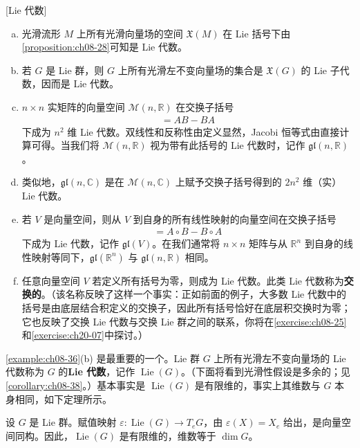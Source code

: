 \documentclass[../../main.tex]{subfiles}
\begin{document}
\begin{example}\label{example:ch08-36}[Lie 代数]
\begin{enumerate}[(a)]
\item 光滑流形 $M$ 上所有光滑向量场的空间 $\mathfrak{X}(M)$ 在 Lie 括号下由\cref{proposition:ch08-28}可知是 Lie 代数。

\item 若 $G$ 是 Lie 群，则 $G$ 上所有光滑左不变向量场的集合是 $\mathfrak{X}(G)$ 的 Lie 子代数，因而是 Lie 代数。

\item $n\times n$ 实矩阵的向量空间 $\mathcal{M}(n,\mathbb{R})$ 在交换子括号
\begin{align*}
[A,B]=AB-BA
\end{align*}
下成为 $n^2$ 维 Lie 代数。双线性和反称性由定义显然，Jacobi 恒等式由直接计算可得。当我们将 $\mathcal{M}(n,\mathbb{R})$ 视为带有此括号的 Lie 代数时，记作 $\mathfrak{gl}(n,\mathbb{R})$。

\item 类似地，$\mathfrak{gl}(n,\mathbb{C})$ 是在 $\mathcal{M}(n,\mathbb{C})$ 上赋予交换子括号得到的 $2n^2$ 维（实）Lie 代数。

\item 若 $V$ 是向量空间，则从 $V$ 到自身的所有线性映射的向量空间在交换子括号
\begin{align*}
[A,B]=A\circ B-B\circ A
\end{align*}
下成为 Lie 代数，记作 $\mathfrak{gl}(V)$。在我们通常将 $n\times n$ 矩阵与从 $\mathbb{R}^n$ 到自身的线性映射等同下，$\mathfrak{gl}(\mathbb{R}^n)$ 与 $\mathfrak{gl}(n,\mathbb{R})$ 相同。

\item 任意向量空间 $V$ 若定义所有括号为零，则成为 Lie 代数。此类 Lie 代数称为\textbf{交换的}。（该名称反映了这样一个事实：正如前面的例子，大多数 Lie 代数中的括号是由底层结合积定义的交换子，因此所有括号恰好在底层积交换时为零；它也反映了交换 Lie 代数与交换 Lie 群之间的联系，你将在\cref{exercise:ch08-25}和\cref{exercise:ch20-07}中探讨。）
\end{enumerate}
\end{example}

\cref{example:ch08-36}(b) 是最重要的一个。Lie 群 $G$ 上所有光滑左不变向量场的 Lie 代数称为 $G$ 的\textbf{Lie 代数}，记作 $\operatorname{Lie}(G)$。（下面将看到光滑性假设是多余的；见\cref{corollary:ch08-38}。）基本事实是 $\operatorname{Lie}(G)$ 是有限维的，事实上其维数与 $G$ 本身相同，如下定理所示。

\begin{theorem}\label{theorem:ch08-37}
设 $G$ 是 Lie 群。赋值映射 $\varepsilon\colon\operatorname{Lie}(G)\to T_eG$，由 $\varepsilon(X)=X_e$ 给出，是向量空间同构。因此，$\operatorname{Lie}(G)$ 是有限维的，维数等于 $\dim G$。
\end{theorem}
\end{document}

